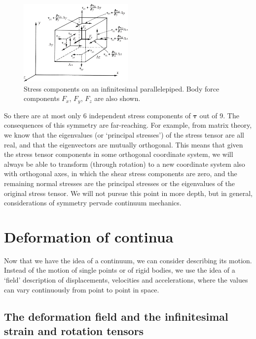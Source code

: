 \documentclass[twoside,11pt]		{report}
\begin{document}
\begin{figure}
\begin{center}
\includegraphics[width=0.5\textwidth]{Fung-3.8.eps}
\end{center}
\caption{Stress components on an infinitesimal parallelepiped. Body
  force components $F_x$, $F_y$, $F_z$ are also shown.}
\label{fig.para}
\end{figure}

So there are at most only 6 independent stress components of
$\bm{\tau}$ out of 9. The consequences of this symmetry are
far-reaching. For example, from matrix theory, we know that the
eigenvalues (or `principal stresses') of the stress tensor are all
real, and that the eigenvectors are mutually orthogonal. This means
that given the stress tensor components in some orthogonal coordinate
system, we will always be able to transform (through rotation) to a
new coordinate system also with orthogonal axes, in which the shear
stress components are zero, and the remaining normal stresses are the
principal stresses or the eigenvalues of the original stress
tensor. We will not pursue this point in more depth, but in general,
considerations of symmetry pervade continuum mechanics.

\section{Deformation of continua}

Now that we have the idea of a continuum, we can consider describing
its motion. Instead of the motion of single points or of rigid bodies,
we use the idea of a `field' description of displacements, velocities
and accelerations, where the values can vary continuously from point
to point in space.

\subsection{The deformation field and the infinitesimal strain and
  rotation tensors}
\end{document}
